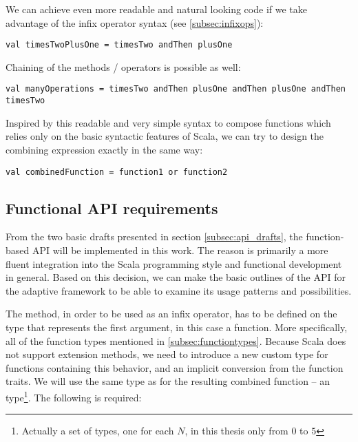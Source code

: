 We can achieve even more readable and natural looking code if we take advantage of the infix operator syntax (see \ref{subsec:infixops}):

\lstset{style=Scala}
\begin{lstlisting}
val timesTwoPlusOne = timesTwo andThen plusOne
\end{lstlisting}

Chaining of the methods / operators is possible as well:

\lstset{style=Scala}
\begin{lstlisting}
val manyOperations = timesTwo andThen plusOne andThen plusOne andThen timesTwo
\end{lstlisting}

Inspired by this readable and very simple syntax to compose functions which relies only on the basic syntactic features of Scala, we can try to design the combining expression exactly in the same way:

\lstset{style=Scala}
\begin{lstlisting}
val combinedFunction = function1 or function2
\end{lstlisting}

\subsection{Functional API requirements}

From the two basic drafts presented in section \ref{subsec:api_drafts}, the function-based API will be implemented in this work. The reason is primarily a more fluent integration into the Scala programming style and functional development in general. Based on this decision, we can make the basic outlines of the API for the adaptive framework to be able to examine its usage patterns and possibilities.

The  method, in order to be used as an infix operator, has to be defined on the type that represents the first argument, in this case a function. More specifically, all of the function types mentioned in \ref{subsec:functiontypes}. Because Scala does not support extension methods, we need to introduce a new custom type for functions containing this behavior, and an implicit conversion from the function traits. We will use the same type as for the resulting combined function -- an  type\footnote{Actually a set of types, one for each $N$, in this thesis only from $0$ to $5$}. The following is required:

